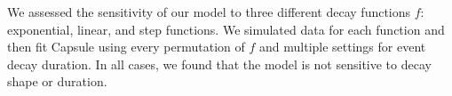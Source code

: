 We assessed the sensitivity of our model to three different decay functions $f$: exponential, linear, and step functions.  We simulated data for each function and then fit Capsule using every permutation of $f$ and multiple settings for event decay duration.  In all cases, we found that the model is not sensitive to decay shape or duration.













